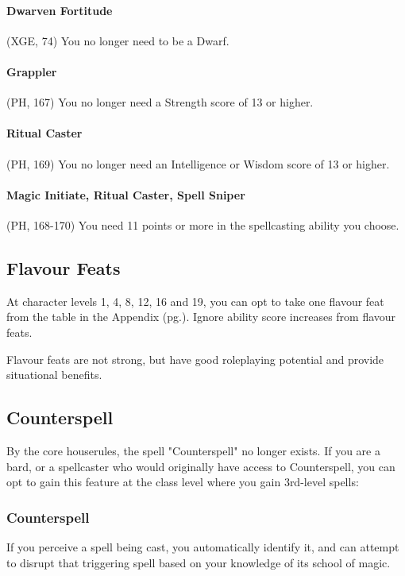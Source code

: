 \documentclass[letterpaper,twocolumn,openany,nodeprecatedcode]{dndbook}
\newcommand{\pg}[1]{pg.\pageref{#1}}
\begin{document}
\paragraph{Dwarven Fortitude} (XGE, 74) You no longer need to be a Dwarf.

\paragraph{Grappler} (PH, 167) You no longer need a Strength score of 13 or higher.

\paragraph{Ritual Caster} (PH, 169) You no longer need an Intelligence or Wisdom score of 13 or higher.

\paragraph{Magic Initiate, Ritual Caster, Spell Sniper} (PH, 168-170) You need 11 points or more in the spellcasting ability you choose.

\label{flavour-feats}
\subsection{Flavour Feats}
At character levels 1, 4, 8, 12, 16 and 19, you can opt to take one flavour feat from the table in the Appendix (\pg{flavour-feats-table}). Ignore ability score increases from flavour feats.

Flavour feats are not strong, but have good roleplaying potential and provide situational benefits.

\label{counterspell}
\subsection{Counterspell}
By the core houserules, the spell "Counterspell" no longer exists. If you are a bard, or a spellcaster who would originally have access to Counterspell, you can opt to gain this feature at the class level where you gain 3rd-level spells:

\subsubsection{Counterspell}
If you perceive a spell being cast, you automatically identify it, and can attempt to disrupt that triggering spell based on your knowledge of its school  of magic.
\end{document}
